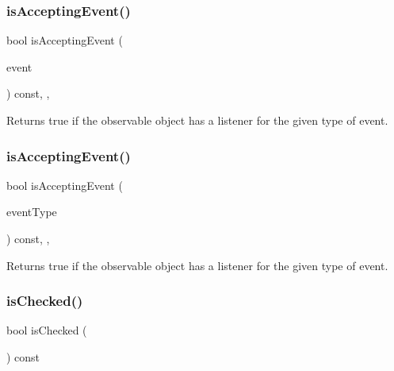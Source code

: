 \subsubsection{\texorpdfstring{is\+Accepting\+Event()}{isAcceptingEvent()}\hspace{0.1cm}{\footnotesize\ttfamily [2/3]}}
{\footnotesize\ttfamily bool is\+Accepting\+Event (\begin{DoxyParamCaption}\item[{const \mbox{\hyperlink{classGEvent}{G\+Event}} \&}]{event }\end{DoxyParamCaption}) const\hspace{0.3cm}{\ttfamily [protected]}, {\ttfamily [virtual]}, {\ttfamily [inherited]}}



Returns true if the observable object has a listener for the given type of event. 

\mbox{\label{classGObservable_a3b1c689267eda44e65a2213e7de38b23}} 
\subsubsection{\texorpdfstring{is\+Accepting\+Event()}{isAcceptingEvent()}\hspace{0.1cm}{\footnotesize\ttfamily [3/3]}}
{\footnotesize\ttfamily bool is\+Accepting\+Event (\begin{DoxyParamCaption}\item[{const std\+::string \&}]{event\+Type }\end{DoxyParamCaption}) const\hspace{0.3cm}{\ttfamily [protected]}, {\ttfamily [virtual]}, {\ttfamily [inherited]}}



Returns true if the observable object has a listener for the given type of event. 

\mbox{\label{classGCheckBox_ac8cada18b9357ff68b26e17f44294764}} 
\subsubsection{\texorpdfstring{is\+Checked()}{isChecked()}}
{\footnotesize\ttfamily bool is\+Checked (\begin{DoxyParamCaption}{ }\end{DoxyParamCaption}) const\hspace{0.3cm}{\ttfamily [virtual]}}



